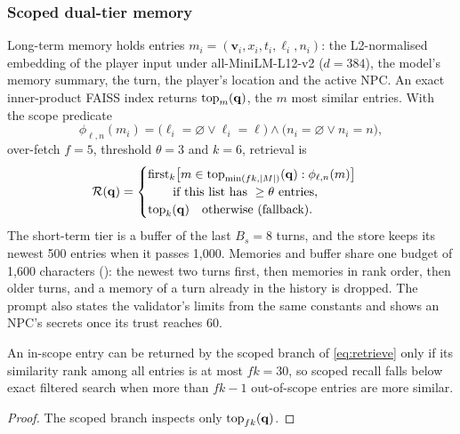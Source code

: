 \documentclass[letterpaper,journal]{IEEEtran}
\begin{document}
\subsubsection{Scoped dual-tier memory}\label{sec:memory-formal}
Long-term memory holds entries $m_i=(\mathbf{v}_i,x_i,t_i,\ell_i,n_i)$: the L2-normalised embedding of the player input under all-MiniLM-L12-v2 \cite{reimers2019sbert,wang2020minilm} ($d=384$), the model's memory summary, the turn, the player's location and the active NPC. An exact inner-product FAISS index \cite{johnson2021faiss} returns $\operatorname{top}_m(\mathbf{q})$, the $m$ most similar entries. With the scope predicate
\begin{equation}\label{eq:scope}
\phi_{\ell,n}(m_i)=\bigl(\ell_i=\varnothing\lor\ell_i=\ell\bigr)\land\bigl(n_i=\varnothing\lor n_i=n\bigr),
\end{equation}
over-fetch $f=5$, threshold $\theta=3$ and $k=6$, retrieval is
\begin{equation}\label{eq:retrieve}
\mathcal{R}(\mathbf{q})=\begin{cases}
\operatorname{first}_k\bigl[m\in\operatorname{top}_{\min(fk,|M|)}(\mathbf{q}) : \phi_{\ell,n}(m)\bigr]\\
\qquad\text{if this list has}\ \ge\theta\ \text{entries},\\
\operatorname{top}_k(\mathbf{q})\quad\text{otherwise (fallback)}.
\end{cases}
\end{equation}
The short-term tier is a buffer of the last $B_s=8$ turns, and the store keeps its newest 500 entries when it passes 1{,}000. Memories and buffer share one budget of 1{,}600 characters (): the newest two turns first, then memories in rank order, then older turns, and a memory of a turn already in the history is dropped. The prompt also states the validator's limits from the same constants and shows an NPC's secrets once its trust reaches 60.

\begin{proposition}\label{prop:postfilter}
An in-scope entry can be returned by the scoped branch of \eqref{eq:retrieve} only if its similarity rank among all entries is at most $fk=30$, so scoped recall falls below exact filtered search when more than $fk-1$ out-of-scope entries are more similar.
\end{proposition}
\begin{proof}
The scoped branch inspects only $\operatorname{top}_{fk}(\mathbf{q})$.
\end{proof}
\end{document}
